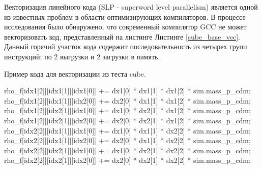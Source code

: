 Векторизация линейного кода (SLP - superword level parallelism) \cite{rosen2007loop,guo2017new} является одной из известных проблем в области оптимизирующих компиляторов.  В процессе исследования было обнаружено, что современный компилятор GCC не может векторизовать код, представленный на листинге Листинге \ref{cube_base_vec}.  Данный горячий участок кода содержит последовательность из четырех групп инструкций: по 2  выгрузки и 2 загрузки в память. 

\begin{ListingEnv}[!h]
	\captiondelim{ } %
	\caption{Пример кода для векторизации из теста cube.}\label{cube_base_vec}
	
	\begin{Verb}
		rho_f[idx1[2]][idx1[1]][idx1[0]] +=
			dx1[0] * dx1[1] * dx1[2] * sim.mass_p_cdm;
		rho_f[idx1[2]][idx1[1]][idx2[0]] +=
			dx2[0] * dx1[1] * dx1[2] * sim.mass_p_cdm;
		rho_f[idx1[2]][idx2[1]][idx1[0]] +=
			dx1[0] * dx2[1] * dx1[2] * sim.mass_p_cdm;
		rho_f[idx1[2]][idx2[1]][idx2[0]] +=
			dx2[0] * dx2[1] * dx1[2] * sim.mass_p_cdm;
		rho_f[idx2[2]][idx1[1]][idx1[0]] +=
			dx1[0] * dx1[1] * dx2[2] * sim.mass_p_cdm;
		rho_f[idx2[2]][idx1[1]][idx2[0]] +=
			dx2[0] * dx1[1] * dx2[2] * sim.mass_p_cdm;
		rho_f[idx2[2]][idx2[1]][idx1[0]] +=
			dx1[0] * dx2[1] * dx2[2] * sim.mass_p_cdm;
		rho_f[idx2[2]][idx2[1]][idx2[0]] +=
			dx2[0] * dx2[1] * dx2[2] * sim.mass_p_cdm;
		
	\end{Verb}
\end{ListingEnv}



